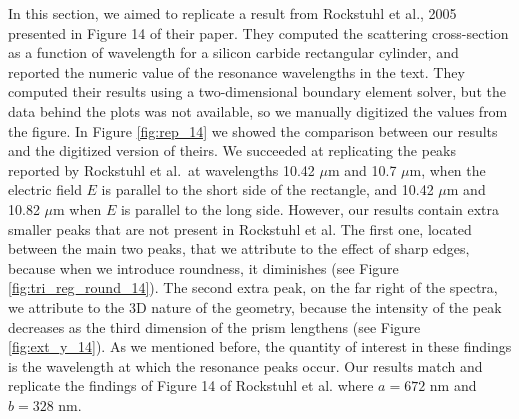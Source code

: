 In this section, we aimed to replicate a result from Rockstuhl et al., 2005 \cite{rockstuhl2005} presented in Figure 14 of their paper. 
They computed the scattering cross-section as a function of wavelength for a silicon carbide rectangular cylinder, and reported the
numeric value of the resonance wavelengths in the text. They computed their results using a two-dimensional boundary element solver, 
but the data behind the plots was not available, so we manually digitized the values from the figure. In Figure \ref{fig:rep_14} we 
showed the comparison between our results and the digitized version of theirs. We succeeded at replicating the peaks reported by 
Rockstuhl et al.\ at wavelengths 10.42 $\mu$m and 10.7 $\mu$m,  when the electric field $E$ is parallel to the short side of 
the rectangle, and 10.42 $\mu$m and 10.82 $\mu$m when $E$ is parallel to the long side. However, our results contain extra smaller peaks 
that are not present in Rockstuhl et al. The first one, located between the main two peaks, that we attribute to the effect of sharp edges, 
because when we introduce roundness, it diminishes (see Figure \ref{fig:tri_reg_round_14}). The second extra peak, on the far right of the spectra, 
we attribute to the 3D nature of the geometry, because the intensity of the peak decreases as the third dimension of the prism lengthens
(see Figure \ref{fig:ext_y_14}). As we mentioned before, the quantity of interest in these findings is the wavelength at which the resonance peaks
occur. Our results match and replicate the findings of Figure 14 of Rockstuhl et al. where $a = 672$ nm and $b = 328$ nm.
